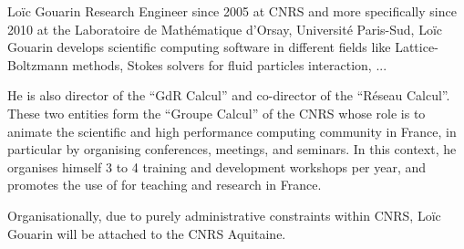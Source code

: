 \begin{participant}[type=R,PM=6,gender=male,salary=5600]{Lo\"ic Gouarin}
  Research Engineer since 2005 at CNRS and more specifically since
  2010 at the Laboratoire de Mathématique d'Orsay, Université
  Paris-Sud, Loïc Gouarin develops scientific computing software in
  different fields like Lattice-Boltzmann methods, Stokes solvers for
  fluid particles interaction, ...

  He is also director of the ``GdR Calcul'' and co-director of the
  ``Réseau Calcul''. These two entities form the ``Groupe Calcul'' of
  the CNRS whose role is to animate the scientific and high
  performance computing community in France, in particular by
  organising conferences, meetings, and seminars. In this context, he
  organises himself 3 to 4 training and development workshops per
  year, and promotes the use of \Python for teaching and research in
  France.

  Organisationally, due to purely administrative constraints within CNRS, 
  Loïc Gouarin will be attached to the CNRS Aquitaine.
\end{participant}

